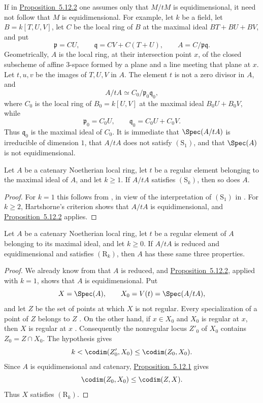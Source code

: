 \begin{remark}[5.12.3]
\label{IV.5.12.3}
If in {\hyperlink{ega4.c04.prop.5-12-2}{Proposition~5.12.2}} one assumes only that $M/tM$ is
equidimensional, it need not follow that $M$ is
equidimensional.  For example, let $k$ be a field, let
$B=k[T,U,V]$, let $C$ be the local ring of $B$ at the maximal
ideal $BT+BU+BV$, and put
\[
  \mathfrak p=CU,\qquad
  \mathfrak q=CV+C(T+U),\qquad
  A=C/\mathfrak p\mathfrak q.
\]
Geometrically, $A$ is the local ring, at their intersection
point $x$, of the closed subscheme of affine $3$-space formed by
a plane and a line meeting that plane at $x$.  Let $t,u,v$ be the
images of $T,U,V$ in $A$.  The element $t$ is not a zero divisor
in $A$, and
\[
  A/tA\simeq C_0/\mathfrak p_0\mathfrak q_0,
\]
where $C_0$ is the local ring of $B_0=k[U,V]$ at the maximal
ideal $B_0U+B_0V$, while
\[
  \mathfrak p_0=C_0U,\qquad
  \mathfrak q_0=C_0U+C_0V.
\]
Thus $\mathfrak q_0$ is the maximal ideal of $C_0$.  It is
immediate that $\Spec(A/tA)$ is irreducible of dimension $1$,
that $A/tA$ does not satisfy $(\mathrm S_1)$, and that
$\Spec(A)$ is not equidimensional.
\end{remark}

\begin{corollary}[5.12.4]
\label{IV.5.12.4}
Let $A$ be a catenary Noetherian local ring, let $t$ be a regular
element belonging to the maximal ideal of $A$, and let $k\geq1$.
If $A/tA$ satisfies $(\mathrm S_k)$, then so does $A$.
\end{corollary}

\begin{proof}
For $k=1$ this follows from , in view of the
interpretation of $(\mathrm S_1)$ in .  For
$k\geq2$, Hartshorne's criterion  shows that
$A/tA$ is equidimensional, and {\hyperlink{ega4.c04.prop.5-12-2}{Proposition~5.12.2}} applies.
\end{proof}

\begin{proposition}[5.12.5]
\label{IV.5.12.5}
Let $A$ be a catenary Noetherian local ring, let $t$ be a regular
element of $A$ belonging to its maximal ideal, and let $k\geq0$.
If $A/tA$ is reduced and equidimensional and satisfies
$(\mathrm R_k)$, then $A$ has these same three properties.
\end{proposition}

\begin{proof}
We already know from  that $A$ is reduced, and
{\hyperlink{ega4.c04.prop.5-12-2}{Proposition~5.12.2}}, applied with $k=1$, shows that $A$ is
equidimensional.  Put
\[
  X=\Spec(A),\qquad X_0=V(t)=\Spec(A/tA),
\]
and let $Z$ be the set of points at which $X$ is not regular.
Every specialization of a point of $Z$ belongs to $Z$
.  On the other hand, if $x\in X_0$ and $X_0$
is regular at $x$, then $X$ is regular at $x$
.  Consequently the nonregular locus $Z'_0$
of $X_0$ contains $Z_0=Z\cap X_0$.  The hypothesis gives
\[
  k<\codim(Z'_0,X_0)\leq\codim(Z_0,X_0).
\]
Since $A$ is equidimensional and catenary, {\hyperlink{ega4.c04.prop.5-12-1}{Proposition~5.12.1}}
gives
\[
  \codim(Z_0,X_0)\leq\codim(Z,X).
\]
Thus $X$ satisfies $(\mathrm R_k)$.
\end{proof}

